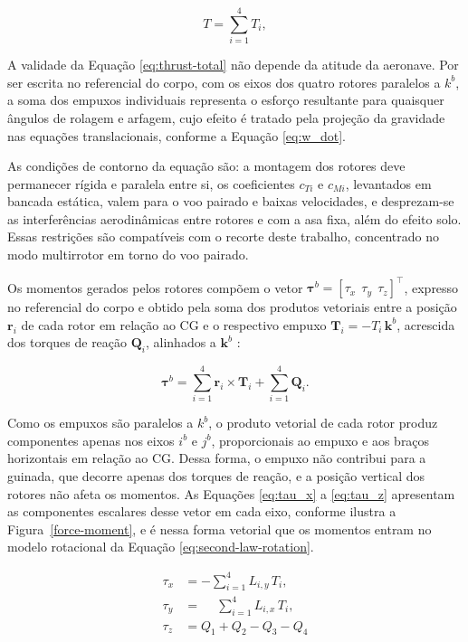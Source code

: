 \begin{equation}
  T = \sum_{i=1}^{4} T_i,
  \label{eq:thrust-total}
\end{equation}

A validade da Equação \eqref{eq:thrust-total} não depende da atitude da aeronave. Por ser escrita no referencial do corpo, com os eixos dos quatro rotores paralelos a $k^b$, a soma dos empuxos individuais representa o esforço resultante para quaisquer ângulos de rolagem e arfagem, cujo efeito é tratado pela projeção da gravidade nas equações translacionais, conforme a Equação \eqref{eq:w_dot}. 

As condições de contorno da equação são: a montagem dos rotores deve permanecer rígida e paralela entre si, os coeficientes $c_{Ti}$ e $c_{Mi}$, levantados em bancada estática, valem para o voo pairado e baixas velocidades, e desprezam-se as interferências aerodinâmicas entre rotores e com a asa fixa, além do efeito solo. Essas restrições são compatíveis com o recorte deste trabalho, concentrado no modo multirrotor em torno do voo pairado.

Os momentos gerados pelos rotores compõem o vetor $\boldsymbol{\tau}^{b} = [\tau_x\ \ \tau_y\ \ \tau_z]^{\top}$, expresso no referencial do corpo e obtido pela soma dos produtos vetoriais entre a posição $\mathbf{r}_i$ de cada rotor em relação ao CG e o respectivo empuxo $\mathbf{T}_i = -T_i\,\mathbf{k}^b$, acrescida dos torques de reação $\mathbf{Q}_i$, alinhados a $\mathbf{k}^b$ \cite{Beard2012}:

\begin{equation}
  \boldsymbol{\tau}^{b} = \sum_{i=1}^{4} \mathbf{r}_i \times \mathbf{T}_i + \sum_{i=1}^{4} \mathbf{Q}_i.
  \label{eq:tau-vetorial}
\end{equation}

Como os empuxos são paralelos a $k^b$, o produto vetorial de cada rotor produz componentes apenas nos eixos $i^b$ e $j^b$, proporcionais ao empuxo e aos braços horizontais em relação ao CG. Dessa forma, o empuxo não contribui para a guinada, que decorre apenas dos torques de reação, e a posição vertical dos rotores não afeta os momentos. As Equações \eqref{eq:tau_x} a \eqref{eq:tau_z} apresentam as componentes escalares desse vetor em cada eixo, conforme ilustra a Figura~\ref{force-moment}, e é nessa forma vetorial que os momentos entram no modelo rotacional da Equação \eqref{eq:second-law-rotation}.

\begin{align}
  \tau_x &= -\sum_{i=1}^{4} L_{i,y}\,T_i, \label{eq:tau_x} \\[2pt]
  \tau_y &= \phantom{-}\sum_{i=1}^{4} L_{i,x}\,T_i, \label{eq:tau_y} \\[2pt]
  \tau_z &= Q_1 + Q_2 - Q_3 - Q_4 \label{eq:tau_z}
\end{align}


